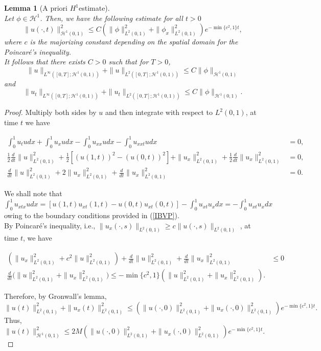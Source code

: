 \documentclass[10pt,a4paper,final]{article}
\numberwithin{equation}{section}
\newtheorem{lemma}[theorem]{Lemma}
\newcommand{\cH}{\mathcal{H}}
\begin{document}
\begin{lemma}[A priori $H^1$estimate]\ \label{aprih1}\\
Let $\phi \in \cH^1$. Then, we have the following estimate for all $t>0$
    $$\|u(\cdot,t)\|_{\cH^1(0,1)}^2\leq C(\|\phi\|_{L^2(0,1)}^2+\|\phi_x\|_{L^2(0,1)}^2)e^{-\min\{c^2,1\}t},$$
    where $c$ is the majorizing constant depending on the spatial domain for the Poincar\'e's inequality.\\
    
     It follows that there exists $C>0$ such that for $T> 0$, 
    $$\|u\|_{L^{\infty}([0,T];\cH^{1}(0,1))} + \|u\|_{L^2([0,T];\cH^{1}(0,1))}\leq C\|\phi\|_{\cH^{1}(0,1)}$$
and 
$$\|u_t\|_{L^{\infty}([0,T];\cH^{1}(0,1))} + \|u_t\|_{L^2([0,T];\cH^{1}(0,1))}\leq C\|\phi \|_{\cH^{1}(0,1)}.$$
\end{lemma}
\begin{proof}
Multiply both sides by $u$ and then integrate with respect to $L^2(0,1)$, at time $t$ we have

\begin{align*}
    \int_0^1 u_tudx + \int_0^1 u_xudx-\int_{0}^1u_{xx}udx-\int_0^1u_{xxt}udx &=0, \\
    \frac{1}{2}\frac{d}{dt}\|u\|_{L^2(0,1)}^2+\frac{1}{2}[(u(1,t))^2-(u(0,t))^2]+\|u_x\|_{L^2(0,1)}^2+\frac{1}{2}\frac{d}{dt}\|u_x\|_{L^2(0,1)}^2&=0, \\
  \frac{d}{dt}\|u\|_{L^2(0,1)}^2+2\|u_x\|_{L^2(0,1)}^2+\frac{d}{dt}\|u_x\|_{L^2(0,1)}^2&=0.
\end{align*}

We shall note that $\int_0^1 u_{xtx}udx=[u(1,t)u_{xt}(1,t)-u(0,t)u_{xt}(0,t)]-\int_0^1 u_{xt}u_xdx=-\int_0^1 u_{xt}u_xdx$ owing to the boundary conditions provided in (\ref{IBVP}).\\

By Poincar\'e's inequality, i.e., $\|u_x(\cdot,s)\|_{L^2(0,1)}\geq c\|u(\cdot,s)\|_{L^2(0,1)}$ , at time $t$, we have

\begin{align*}
 (\|u_x\|_{L^2(0,1)}^2+c^2\|u\|_{L^2(0,1)}^2)+   \frac{d}{dt}\|u\|_{L^2(0,1)}^2+\frac{d}{dt}\|u_x\|_{L^2(0,1)}^2&\leq 0 \\
  \frac{d}{dt}\bigg(\|u\|_{L^2(0,1)}^2+\|u_x\|_{L^2(0,1)}^2\bigg)\leq -\min\{c^2,1\}(\|u\|_{L^2(0,1)}^2+\|u_x\|_{L^2(0,1)}^2).
\end{align*}

Therefore, by Gronwall's lemma, 
$$\|u(t)\|_{L^2(0,1)}^2+\|u_x(t)\|_{L^2(0,1)}^2\leq (\|u(\cdot,0)\|_{L^2(0,1)}^2+\|u_x(\cdot,0)\|_{L^2(0,1)}^2)e^{-\min\{c^2,1\}t}.$$
Thus, 
$$\|u(t)\|_{\cH^1(0,1)}^2\leq 2M(\|u(\cdot,0)\|_{L^2(0,1)}^2+\|u_x(\cdot,0)\|_{L^2(0,1)}^2)e^{-\min\{c^2,1\}t}.$$


\end{proof}
\end{document}
